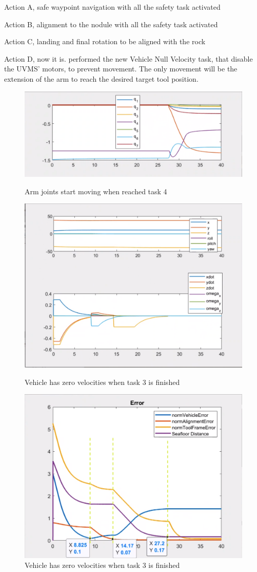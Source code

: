 \documentclass{article}
\begin{document}
\begin{description}
	\item Action A, safe waypoint navigation with all the safety task activated
	\item Action B, alignment to the nodule with all the safety task activated
	\item Action C, landing and final rotation to be aligned with the rock
	\item Action D, now it is. performed the new Vehicle Null Velocity task, that disable the UVMS' motors, to prevent movement. The only movement will be the extension of the arm to reach the desired target tool position. 
\end{description}

\begin{figure}[htp]
\centering
\includegraphics[width=.6\textwidth]{411_q.png}\caption{Arm joints start moving when reached task 4}
\centering
\label{fig:411_arm}
\includegraphics[width=.6\textwidth]{411_ppdot.png}\caption{Vehicle has zero velocities when task 3 is finished}
\label{fig:411_vehicle}
\includegraphics[width=.6\textwidth]{411_Errors.png}\caption{Vehicle has zero velocities when task 3 is finished}
\label{fig:411_errors}
\end{figure}
\end{document}
